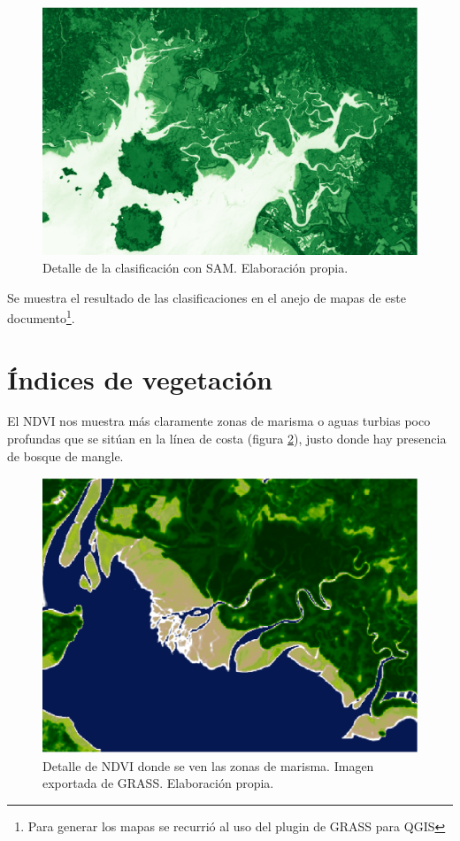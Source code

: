 \begin{figure}
	\centering
	\includegraphics[width=0.8\linewidth]{./Imagenes/Detalle_SAM.eps}
	\caption[Detalle clasificación con \textit{Spectral Angle Mapper}]{Detalle de la clasificación con \ac{SAM}. Elaboración propia.}
	\label{fig:detalle_SAM}
\end{figure}

Se muestra el resultado de las clasificaciones en el anejo de mapas de este documento\footnote{Para generar los mapas se recurrió al uso del plugin de GRASS para QGIS}.

\section{Índices de vegetación}
El \ac{NDVI} nos muestra más claramente zonas de marisma o aguas turbias poco profundas que se sitúan en la línea de costa (figura \ref{fig:detalle_aguas}), justo donde hay presencia de bosque de mangle.%

\begin{figure}
	\centering
	\includegraphics[width=0.8\linewidth]{./Imagenes/Detalle_aguas.eps}
	\caption[Detalle marismas en NDVI]{Detalle de NDVI donde se ven las zonas de marisma. Imagen exportada de GRASS. Elaboración propia.}
	\label{fig:detalle_aguas}
\end{figure}

